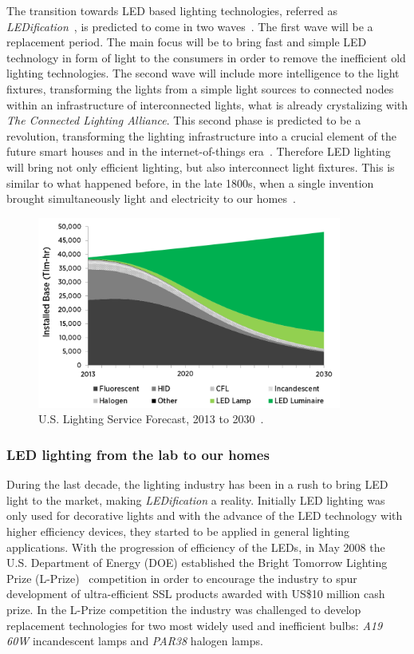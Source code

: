 The transition towards LED based lighting technologies, referred as \emph{LEDification}~\cite{13Hammerschmidt,15crawford}, is predicted to come in two waves~\cite{13liedenbaum}. The first wave will be a replacement period. The main focus will be to bring fast and simple LED technology in form of light to the consumers in order to remove the inefficient old lighting technologies. The second wave will include more intelligence to the light fixtures, transforming the lights from a simple light sources to connected nodes within an infrastructure of interconnected lights, what is already crystalizing with \emph{The Connected Lighting Alliance}. This second phase is predicted to be a revolution, transforming  the lighting infrastructure into a crucial element of the future smart houses and in the internet-of-things era~\cite{14Harbers}. Therefore LED lighting will bring not only efficient lighting, but also interconnect light fixtures. This is similar to what happened before, in the late 1800s, when a single invention brought simultaneously light and electricity to our homes~\cite{14NYISO}.

\begin{figure}[!h]
\centering
\includegraphics[width=10cm]{./0_intro/img/lighting_forecast.png}
\caption{U.S. Lighting Service Forecast, 2013 to 2030~\cite{14USDoE}.  }
\label{fig:lighting_forecast}
\end{figure}

\subsubsection{LED lighting from the lab to our homes}

During the last decade, the lighting industry has been in a rush to bring LED light to the market, making \emph{LEDification} a reality. Initially LED lighting was only used for decorative lights and with the advance of the LED technology with higher efficiency devices, they started to be applied in general lighting applications. With the progression of efficiency of the LEDs, in May 2008 the U.S. Department of Energy (DOE) established the Bright Tomorrow Lighting Prize (L-Prize)~\cite{web:LPrize,09Taub} competition in order to encourage the industry to spur development of ultra-efficient SSL products awarded with US\$10 million cash prize. In the L-Prize competition the industry was challenged to develop replacement technologies for two most widely used and inefficient bulbs: \emph{A19 60W} incandescent lamps and \emph{PAR38} halogen lamps.

